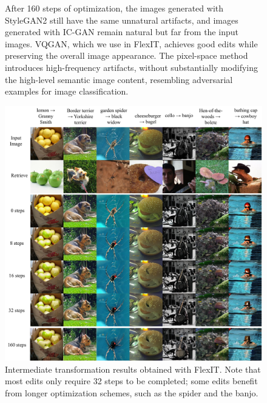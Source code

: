 \begin{figure}[t!]
{    After 160 steps of optimization, the images generated with StyleGAN2 still have the same unnatural artifacts, and images generated with IC-GAN remain natural but  far from the input images.
    VQGAN, which we use in FlexIT, achieves good edits while preserving the overall image appearance.
    The pixel-space method introduces high-frequency artifacts, without substantially modifying the high-level semantic image content, resembling adversarial examples for image classification. 
    }
    \label{fig:encoders2}
\end{figure}



\begin{figure}[t!]
    \center
    \includegraphics[width=\linewidth]{images/flexit/assets/steps.pdf}
    \caption{Intermediate transformation results obtained with FlexIT. Note that most edits only require 32 steps to be completed; some edits benefit from longer optimization schemes, such as the  spider and the banjo.
    }
    \label{fig:steps}
\end{figure}

